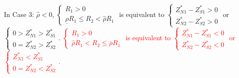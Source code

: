 \documentclass[10pt]{article}
\newcommand{\hhred}{\textcolor{red}}
\begin{document}
In Case 3: $ {\hat \rho} < 0 $, $ \left\{ \begin{matrix} R_1 > 0 \\ \underline{\rho} R_1 \leqslant R_2 < {\hat \rho} R_1 \end{matrix} \right. $ is equivalent to $ \left\{ \begin{matrix} Z_{N 1}^* - Z_{S 1}^* > 0 \\ Z_{N 2}^* - Z_{S 2}^* > 0 \end{matrix} \right. $ or $ \left\{ \begin{matrix} 0 > Z_{N 1}^* > Z_{S 1}^* \\ 0 = Z_{N 2}^* > Z_{S 2}^* \end{matrix} \right. $.
\hhred{$ \left\{ \begin{matrix} R_1 > 0 \\ {\hat \rho} R_1 < R_2 \leqslant \overline{\rho} R_1 \end{matrix} \right. $ is equivalent to $ \left\{ \begin{matrix} Z_{N 1}^* - Z_{S 1}^* < 0 \\ Z_{N 2}^* - Z_{S 2}^* < 0 \end{matrix} \right. $ or $ \left\{ \begin{matrix} Z_{N 1}^* < Z_{S 1}^* \\ 0 = Z_{N 2}^* < Z_{S 2}^* \end{matrix} \right. $.}
\end{document}
